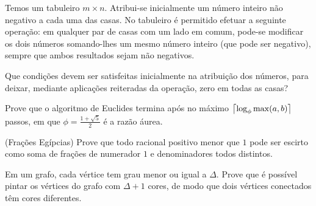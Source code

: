 \documentclass[10pt,a4paper]{article}
\begin{document}
	\begin{prob}
		Temos um tabuleiro $m \times n$. Atribui-se inicialmente um número inteiro não negativo a cada uma das casas. No tabuleiro é permitido efetuar a seguinte operação: em qualquer par de casas com um lado em comum, pode-se modificar os dois números somando-lhes um mesmo número inteiro (que pode ser negativo), sempre que ambos resultados sejam não negativos.

		Que condições devem ser satisfeitas inicialmente na atribuição dos números, para deixar, mediante aplicações reiteradas da operação, zero em todas as casas?
	\end{prob}

	\begin{prob}
		Prove que o algoritmo de Euclides termina após no máximo $\left \lceil{\log_\phi\max(a, b)}\right \rceil$ passos, em que $\phi = \frac{1 + \sqrt{5}}{2}$ é a razão áurea.
	\end{prob}

	\begin{prob}(Frações Egípcias)
		Prove que todo racional positivo menor que $1$ pode ser escirto como soma de frações de numerador $1$ e denominadores todos distintos.
	\end{prob}

	\begin{prob}
		Em um grafo, cada vértice tem grau menor ou igual a $\Delta$. Prove que é possível pintar os vértices do grafo com $\Delta + 1$ cores, de modo que dois vértices conectados têm cores diferentes.
	\end{prob}
\end{document}
